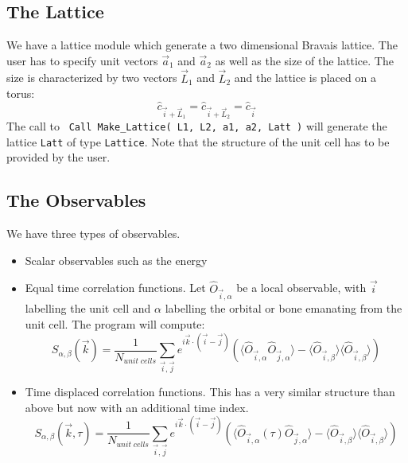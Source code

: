 \subsection{The Lattice}

We have a lattice module  which  generate  a two dimensional Bravais lattice.  The user has to specify unit vectors $\vec{a}_1$ and $\vec{a}_2$ as well as   the size of the  lattice. The size is  characterized by  two vectors $\vec{L}_1$ and $\vec{L}_2$   and  the lattice is placed on a torus: 
\begin{equation}
	\hat{c}_{\vec{i} + \vec{L}_1 }  = \hat{c}_{\vec{i} + \vec{L}_2 }  = \hat{c}_{\vec{i}}
\end{equation}
The call to 
\texttt{ Call Make\_Lattice( L1, L2, a1,  a2, Latt )} will generate the lattice   \texttt{Latt} of type \texttt{Lattice}.   Note that  the structure of the unit cell has to be provided by the user. 
 


\subsection{The Observables}

We have three types of observables. 
\begin{itemize}
\item Scalar observables such as the energy
\item Equal time correlation functions.  Let $\hat{O}_{\vec{i},\alpha} $ be a local observable,  with $\vec{i}$ labelling the unit cell and $\alpha$ labelling the orbital or bone emanating 
from the unit cell.   The program will compute: 
\begin{equation}
	S_{\alpha,\beta}(\vec{k}) = \frac{1}{N_{unit \;  cells}} \sum_{\vec{i},\vec{j}} e^{i \vec{k}\cdot (\vec{i} -  \vec{j} ) } \left( \langle \hat{O}_{\vec{i},\alpha}  \hat{O}_{\vec{j},\alpha} \rangle  - 
	  \langle \hat{O}_{\vec{i},\beta} \rangle \langle   \hat{O}_{\vec{i},\beta}  \rangle \right) 
\end{equation}
\item  Time displaced correlation functions. This has a very similar structure than above but now with an additional time index.
\begin{equation}
	S_{\alpha,\beta}(\vec{k},\tau) = \frac{1}{N_{unit \;  cells}} \sum_{\vec{i},\vec{j}} e^{i \vec{k}\cdot (\vec{i} -  \vec{j} ) } \left( \langle \hat{O}_{\vec{i},\alpha} (\tau) \hat{O}_{\vec{j},\alpha} \rangle  - 
	  \langle \hat{O}_{\vec{i},\beta} \rangle \langle   \hat{O}_{\vec{i},\beta}  \rangle \right) 
\end{equation}
\end{itemize}

